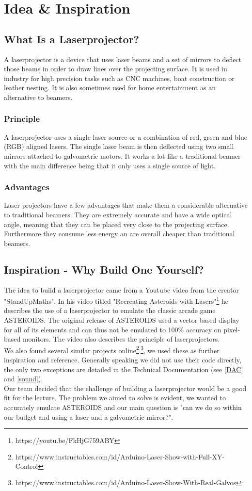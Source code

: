 \documentclass{report}
\begin{document}
\chapter{Idea \& Inspiration}
\section{What Is a Laserprojector?}
A laserprojector is a device that uses laser beams and a set of mirrors to deflect those beams in order to draw lines over the projecting surface. It is used in industry for high precision tasks such as CNC machines, boat construction or leather nesting. It is also sometimes used for home entertainment as an alternative to beamers.
\subsection{Principle}
A laserprojector uses a single laser source or a combination of red, green and blue (RGB) aligned lasers. The single laser beam is then deflected using two small mirrors attached to galvometric motors. It works a lot like a traditional beamer with the main difference being that it only uses a single source of light.
\subsection{Advantages}
Laser projectors have a few advantages that make them a considerable alternative to traditional beamers. They are extremely accurate and have a wide optical angle, meaning that they can be placed very close to the projecting surface. Furthermore they consume less energy an are overall cheaper than traditional beamers.
\section{Inspiration - Why Build One Yourself?}
The idea to build a laserprojector came from a Youtube video from the creator "StandUpMaths". In his video titled "Recreating Asteroids with Lasers"\footnote{https://youtu.be/FkHjG759ABY} he describes the use of a laserprojector to emulate the classic arcade game ASTEROIDS. The original release of ASTEROIDS used a vector based display for all of its elements and can thus not be emulated to 100\% accuracy on pixel-based monitors. The video also describes the principle of laserprojectors. \\
We also found several similar projects online\footnote{https://www.instructables.com/id/Arduino-Laser-Show-with-Full-XY-Control}\textsuperscript{,}\footnote{https://www.instructables.com/id/Arduino-Laser-Show-With-Real-Galvos}, we used these as further inspiration and reference. Generally speaking we did not use their code directly, the only two exceptions are detailed in the Technical Documentation (see \ref{DAC} and \ref{sound}). \\
Our team decided that the challenge of building a laserprojector would be a good fit for the lecture.
The problem we aimed to solve is evident, we wanted to accurately emulate ASTEROIDS and our main question is "can we do so within our budget and using a laser and a galvometric mirror?".
\end{document}
